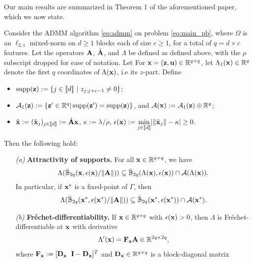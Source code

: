 Our main results are summarized in Theorem 1 of the aforementioned paper, which we now state.
\begin{theorem} Consider the ADMM algorithm \eqref{eq:admm} on problem
  \eqref{eq:main_pb}, where $\Omega$ is an $\ell_{2,1}$ mixed-norm on
  $d \ge 1$ blocks each of size $c \ge 1$, for a total of $q = d
  \times c$ features. Let the operators $\mathbf{A}$, $\tilde{\mathbf{A}}$, and $\Lambda$ be
  defined as defined above, with the $\rho$ subscript
  dropped for ease of notation. Let For $\mathbf{x} = (\mathbf{z}, \mathbf{u}) \in\mathbb{R}^{q+q}$, let $\Lambda_1(\mathbf{x}) \in \mathbb R^q$ denote the first $q$ coordinates of $\Lambda(\mathbf{x})$, i.e its $z$-part. Define
  \begin{itemize}
    \item $\operatorname{supp}(\mathbf{z}) := \{j\in[\![d]\!]\text{ }|\text{ }z_{j:j+c-1} \ne
      0\}$;
      \item $\mathcal{A}_1(\mathbf{z}) := \{\mathbf{z}' \in \mathbb{R}^{q} |
    \operatorname{supp}(\mathbf{z}') = \operatorname{supp}(\mathbf{z})\}$, and $\mathcal A(\mathbf{x}) := \mathcal A_1(\mathbf{z}) \oplus \mathbb R^q$;
   \item $\tilde{\mathbf{x}} := (\tilde{\mathbf{x}}_j)_{j \in [\![d]\!]} := \tilde{\mathbf{A}}\mathbf{x}$, $\kappa :=
    \lambda / \rho$, $\epsilon(\mathbf{x}) :=
      \underset{j \in [\![d]\!]}{\min}\text{}|\|\tilde{\mathbf{x}}_j\|-\kappa| \ge 0$.
    \end{itemize}
Then the following hold:
\begin{itemize}
\item[\textit{(a)}] \textbf{Attractivity of supports.} For all $\mathbf{x} \in
  \mathbb{R}^{q+q}$, we have
  \[\Lambda(\bar{\mathbb{B}}_{2q}(\mathbf{x},\epsilon(\mathbf{x})/\|\mathbf{A}\|)) \subseteq
  \bar{\mathbb{B}}_{2q}(\Lambda(\mathbf{x}),\epsilon(\mathbf{x})) \cap
  \mathcal{A}(\Lambda(\mathbf{x})).\] In
  particular, if $\mathbf{x}^*$ is a fixed-point of $\Gamma$, then
  \[
  \Lambda(\bar{\mathbb{B}}_{2q}(\mathbf{x}^*,\epsilon(\mathbf{x}^*)/\|\mathbf{A}\|))
  \subseteq
  \bar{\mathbb{B}}_{2q}(\mathbf{x}^*,\epsilon(\mathbf{x}^*)) \cap \mathcal{A}(\mathbf{x}^*).
  \]
\item[\textit{(b)}] \textbf{Fr\'echet-differentiability.} If $\mathbf{x} \in
  \mathbb{R}^{q+q}$ with
  $\epsilon(\mathbf{x}) > 0$, then $\Lambda$ is Fr\'echet-differentiable at $\mathbf{x}$ with
  derivative
\begin{eqnarray}
  \Lambda'(\mathbf{x}) = \mathbf{F}_{\mathbf{x}}\mathbf{A} \in \mathbb{R}^{2q \times 2q},
\label{eq:linear}
\end{eqnarray}
where $\mathbf{F}_{\mathbf{x}} := [\mathbf{D}_{\mathbf{x}} \hspace{.6em} \mathbf{I} - \mathbf{D}_{\mathbf{x}}]^T$ and  $\mathbf{D}_{\mathbf{x}} \in
\mathbb{R}^{q \times q}$ is a block-diagonal matrix

\end{itemize}
\end{theorem}
